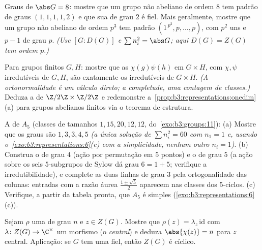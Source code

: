 \begin{exercise}[$\star\star$]\label{exo:b3:representations:7}
Graus de $\abs G = 8$: mostre que um grupo não abeliano de ordem $8$ tem
padrão de graus $(1,1,1,1,2)$ e que sua  de grau $2$ é fiel.
Mais geralmente, mostre que um grupo não abeliano de ordem $p^3$ tem
padrão $(1^{\,p^2},
p, \dots, p)$, com $p^2$ uns e $p - 1$  de grau
$p$. \emph{(Use $[G : D(G)]$ e $\sum n_i^2 = \abs G$; aqui $D(G) = Z(G)$ tem ordem $p$.)}
\end{exercise}

\begin{exercise}[$\star\star\star$]\label{exo:b3:representations:8}
Para grupos finitos $G, H$: mostre que as  $\chi(g)\psi(h)$
em $G \times H$, com $\chi, \psi$  irredutíveis de $G, H$, são
exatamente os  irredutíveis de $G \times H$. \emph{(A ortonormalidade
é um cálculo direto; a completude, uma contagem de classes.)} Deduza a
 de $\Z/2\Z \times \Z/2\Z$ e redemonstre a~\cref{prop:b3:representations:onedim}(a) para
grupos abelianos finitos via o teorema de estrutura.
\end{exercise}

\begin{exercise}[$\star\star\star$]\label{exo:b3:representations:9}
A  de $A_5$ (classes de tamanhos $1, 15, 20, 12,
12$, do~\cref{exo:b3:groups:11}):
(a) Mostre que os graus são $1, 3, 3, 4, 5$ \emph{(a única solução de $\sum n_i^2 = 60$ com
$n_1 = 1$ e, usando o~\cref{exo:b3:representations:6}(c) com a simplicidade, nenhum outro
$n_i = 1$)}.
(b) Construa o  de grau $4$ (ação por permutação em $5$
pontos) e o de grau $5$ (a ação sobre os seis $5$-subgrupos de
Sylow dá grau $6 = 1 + 5$; verifique a irredutibilidade), e complete as duas
linhas de grau $3$ pela ortogonalidade das colunas: entradas com a
razão áurea $\frac{1\pm\sqrt5}2$ aparecem nas classes dos $5$-ciclos.
(c) Verifique, a partir da tabela pronta, que $A_5$ é simples
(\cref{exo:b3:representations:6}(c)).
\end{exercise}

\begin{exercise}[$\star\star$]\label{exo:b3:representations:10}
Sejam $\rho$ uma  de grau $n$ e $z
\in Z(G)$.
Mostre que $\rho(z) = \lambda_z\,\mathrm{id}$ com $\lambda \colon Z(G) \to \C^\times$ um morfismo (o \emph{ central}) e
deduza $\abs{\chi(z)} = n$ para $z$ central. Aplicação: se $G$ tem uma
 fiel, então $Z(G)$ é cíclico.
\end{exercise}

